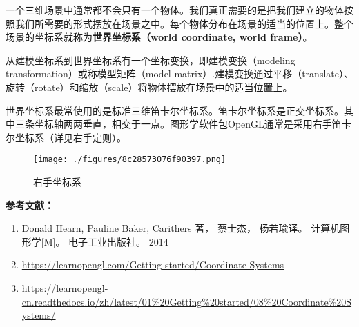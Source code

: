 


一个三维场景中通常都不会只有一个物体。我们真正需要的是把我们建立的物体按照我们所需要的形式摆放在场景之中。每个物体分布在场景的适当的位置上。整个场景的坐标系就称为\textbf{世界坐标系（world coordinate, world frame）}。

从建模坐标系到世界坐标系有一个坐标变换，即建模变换（modeling transformation）或称模型矩阵（model matrix）.建模变换通过平移（translate）、旋转（rotate）和缩放（scale）将物体摆放在场景中的适当位置上。

世界坐标系最常使用的是标准三维笛卡尔坐标系。笛卡尔坐标系是正交坐标系。其中三条坐标轴两两垂直，相交于一点。图形学软件包OpenGL通常是采用右手笛卡尔坐标系（详见右手定则）。


\begin{figure}[ht]
\centering
\texttt{[image: ./figures/8c28573076f90397.png]}
\caption{右手坐标系} \label{fig_Worcod_1}
\end{figure}


\textbf{参考文献：}
\begin{enumerate}
\item Donald Hearn, Pauline Baker, Carithers 著， 蔡士杰， 杨若瑜译。 计算机图形学[M]。 电子工业出版社。 2014
\item \href{https://learnopengl.com/Getting-started/Coordinate-Systems}{https://learnopengl.com/Getting-started/Coordinate-Systems}
\item \href{https://learnopengl-cn.readthedocs.io/zh/latest/01\%20Getting\%20started/08\%20Coordinate\%20Systems/}{https://learnopengl-cn.readthedocs.io/zh/latest/01\%20Getting\%20started/08\%20Coordinate\%20Systems/}
\end{enumerate}
